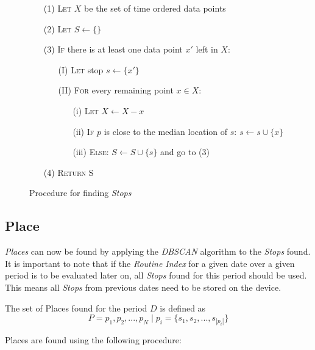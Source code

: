 \begin{figure}[h]
    \centering
    \begin{itemize}
        \item[(1)] \textsc{Let} $X$ be the set of time ordered data points
        \item[(2)] \textsc{Let} $S \leftarrow \{ \}$
        \item[(3)] \textsc{If} there is at least one data point $x'$ left in $X$:
            \begin{itemize}
                \item[(I)] \textsc{Let} stop $s \leftarrow \{ x' \}$
            \item[(II)] \textsc{For} every remaining point $x \in X$:
            \begin{itemize}
                \item[(i)] \textsc{Let} $X \leftarrow X - x$
                \item[(ii)] \textsc{If} $p$ is close to the median location of $s$: $s \leftarrow s \cup \{ x \}$
                \item[(iii)] \textsc{Else}: $S \leftarrow S \cup \{ s \}$ and go to \textsc{(3)}
            \end{itemize}
            \end{itemize}
        \item[(4)] \textsc{Return} S
    \end{itemize} 
    \caption{Procedure for finding \textit{Stops}}
    \label{fig:find_stops}
\end{figure}

\subsection{Place}
\textit{Places} can now be found by applying the \textit{DBSCAN} algorithm to the \textit{Stops} found. It is important to note that if the \textit{Routine Index} for a given date over a given period is to be evaluated later on, all \textit{Stops} found for this period should be used. This means all \textit{Stops} from previous dates need to be stored on the device. 

The set of Places found for the period $D$ is defined as $$P = {p_1, p_2, ..., p_N} \;|\; p_i = \{s_1, s_2, ..., s_{|p_i|}\}$$

Places are found using the following procedure:

